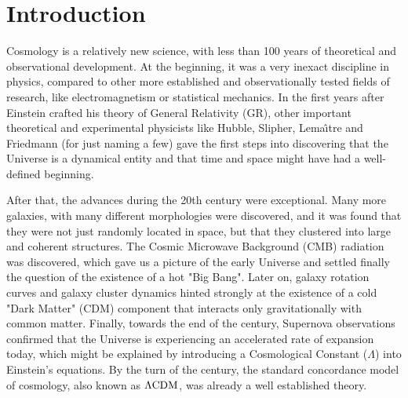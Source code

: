 \chapter*{Introduction \label{IntroIntro}} %





Cosmology is a relatively new science, with less than 100 years of theoretical and observational development.
At the beginning, it was a very inexact discipline in physics, compared to other more established and observationally tested fields of research, like electromagnetism or statistical mechanics.
In the first years after Einstein crafted his theory of General Relativity (GR), other important theoretical and experimental physicists like Hubble, Slipher, Lema\^{\i}tre and Friedmann (for just naming a few) gave the first steps into discovering
that the Universe is a dynamical entity and that time and space might have had a well-defined beginning.

After that, the advances during the 20th century were exceptional. Many more galaxies, with many different morphologies were discovered,
and it was found that they were not just randomly located in space, but that they clustered into large and coherent structures. The Cosmic Microwave Background (CMB) radiation was discovered, which gave us a picture of the early Universe and settled finally the question of the existence of a hot "Big Bang". Later on, galaxy rotation curves and galaxy cluster dynamics hinted strongly at the existence of a cold "Dark Matter" (CDM) component that interacts only gravitationally with common matter. Finally, towards the end of the century, Supernova observations confirmed that the Universe 
is experiencing an accelerated rate of expansion today, which might be explained
by introducing a Cosmological Constant ($\Lambda$) into Einstein's equations. 
By the turn of the century, the standard concordance
model of cosmology, also known as $\Lambda\mathrm{CDM}$, was already a well established theory.

